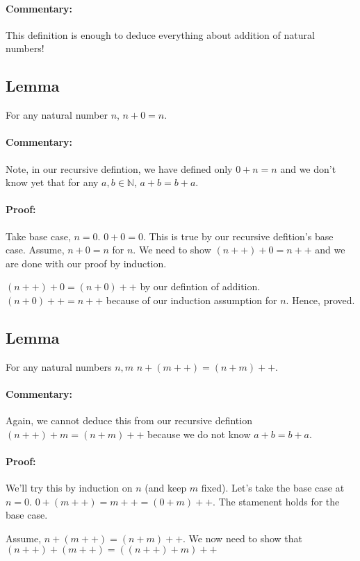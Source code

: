 \documentclass{report}
\begin{document}
\paragraph{Commentary:} This definition is enough to deduce everything about addition of natural numbers!
\subsection{Lemma} For any natural number $n$, $n+0 = n$. 


\paragraph{Commentary:} Note, in our recursive defintion, we have defined only $0+n=n$ and we don't know yet that for any $a,b \in \mathbb{N}$, $a+b=b+a$.
\paragraph{Proof:} Take base case, $n = 0$. $0+0=0$. This is true by our recursive defition's base case. Assume, $n+0 = n$ for $n$. We need to show $(n++)+0 = n++$ and we are done with our proof by induction. 

 $\left( n++ \right) +0 = \left( n + 0 \right) ++ $ by our defintion of addition. $\left( n+0 \right) ++ = n++$ because of our induction assumption for $n$. Hence, proved.

 \subsection{Lemma} For any natural numbers $n,m$ $n+\left( m++ \right) = \left( n+m \right) ++$.

\paragraph{Commentary:}Again, we cannot deduce this from our recursive defintion  $\left( n++ \right) + m = \left( n+m \right) ++$ because we do not know $a+b = b+a$. 

\paragraph{Proof: } We'll try this by induction on $n$ (and keep $m$ fixed). Let's take the base case at $n=0$. $0+\left( m++ \right) = m++ = \left( 0 + m \right) ++ $. The stamenent holds for the base case.

Assume, $n+\left( m++ \right) = \left( n+m \right) ++$. We now need to show that $\left( n++ \right) + \left( m++ \right) = \left( \left( n++ \right) + m \right) ++ $
\end{document}
